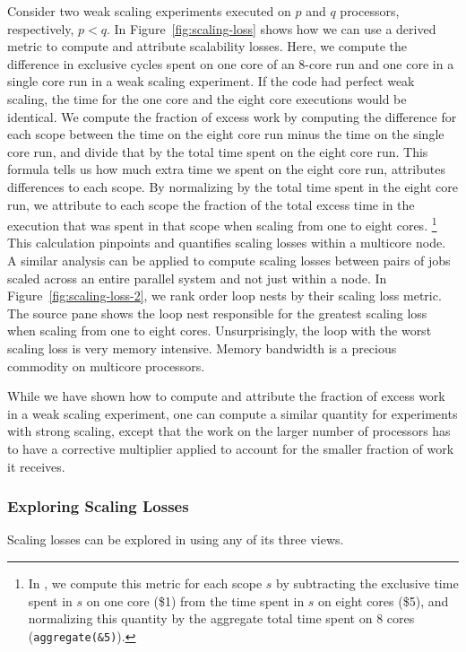 \documentclass[11pt,letterpaper]{report}
\begin{document}
Consider two weak scaling experiments executed on $p$ and $q$ processors, respectively, $p<q$.
In Figure~\ref{fig:scaling-loss} shows how we can use a derived metric to compute and attribute scalability losses.
Here, we compute the difference in exclusive cycles spent on one core of an 8-core run and one core in a single core run in a weak scaling experiment.
If the code had perfect weak scaling, the time for the one core and the eight
core executions would be identical.
We compute the fraction of excess work by computing the difference for each scope between the time on the eight core run minus the time on the single core run, and divide that by the total time spent on the eight core run.
This formula tells us how much extra time we spent on the eight core run, attributes differences to each scope.
By normalizing by the total time spent in the eight core run, we attribute to each scope the fraction of the total excess time in the execution that was spent in that scope when scaling from one to eight cores.%
\footnote{In \hpcviewer{}, we compute this metric for each scope
$s$ by subtracting the exclusive time spent in $s$ on one core (\$1) from
the time spent in $s$ on eight cores (\$5), and normalizing this quantity
by the aggregate total time spent on 8 cores ({\tt aggregate(\&5)}).}
This calculation pinpoints and quantifies scaling losses within a multicore node.
A similar analysis can be applied to compute scaling losses between pairs of jobs scaled across an entire parallel system and not just within a node.
In Figure~\ref{fig:scaling-loss-2}, we rank order loop nests by their scaling loss metric.
The source pane shows the loop nest responsible for the greatest scaling loss when scaling from one to eight cores.
Unsurprisingly, the loop with the worst scaling loss is very memory intensive.
Memory bandwidth is a precious commodity on multicore processors.

While we have shown how to compute and attribute the fraction of excess work in a weak scaling experiment, one can compute a similar quantity for experiments with strong scaling, except that the work on the larger number of processors has to have a corrective multiplier applied to account for the smaller fraction of work it receives.


\subsubsection{Exploring Scaling Losses}

Scaling losses can be explored in \hpcviewer{} using any of its three views.
\end{document}
